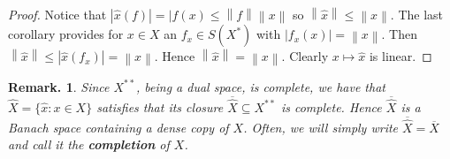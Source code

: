 \documentclass[11pt, a4paper]{memoir}
\newcommand{\norm}[1]{\ensuremath{\left\lVert#1\right\rVert}}
\theoremstyle{change}
\theoremstyle{plain}
\theoremstyle{nonumberplain}
\newtheorem{remark}{Remark.}
\newtheorem{proof}{Proof}
\numberwithin{equation}{section}
\begin{document}
\begin{proof}
    Notice that $|\hat x(f)|=|f(x)\leq\norm{f}\norm{x}$ so $\norm{\hat x}\leq\norm{x}$.
    The last corollary provides for $x\in X$ an $f_x\in S(X^*)$ with $|f_x(x)|=\norm{x}$.
    Then $\norm{\hat x}\leq|\hat x(f_x)|=\norm{x}$.
    Hence $\norm{\hat x}=\norm{x}$.
    Clearly $x\mapsto\hat x$ is linear.
\end{proof}
\begin{remark}
    Since $X^{**}$, being a dual space, is complete, we have that $\hat X=\{\hat x:x\in X\}$ satisfies that its closure $\overline{\hat X}\subseteq X^{**}$ is complete.
    Hence $\overline{\hat X}$ is a Banach space containing a dense copy of $X$.
    Often, we will simply write $\overline{\hat X}=\overline{X}$ and call it the \textbf{completion} of $X$.
\end{remark}
\end{document}
